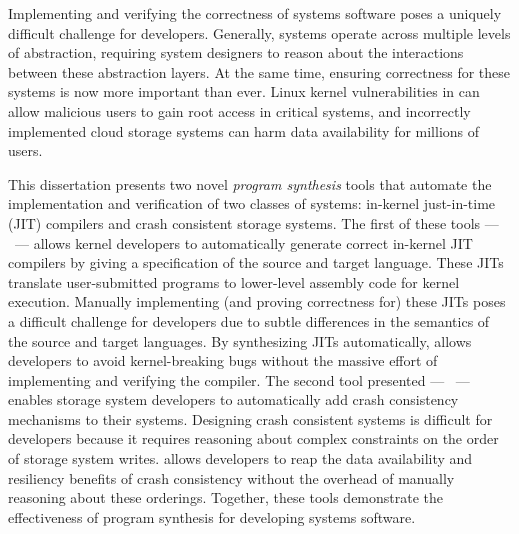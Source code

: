 Implementing and verifying the correctness of systems software
poses a uniquely difficult challenge for developers.
Generally, systems operate across multiple
levels of abstraction, requiring system designers to reason about the
interactions between these abstraction layers.
At the same time, ensuring correctness for these systems is now
more important than ever.
Linux kernel vulnerabilities in can allow malicious users to gain root access
in critical systems, and incorrectly implemented cloud storage systems
can harm data availability for millions of users.

This dissertation presents two novel \textit{program synthesis} tools
that automate the implementation and verification of two classes of systems:
in-kernel just-in-time (JIT) compilers and crash consistent storage systems.
The first of these tools --- \jitsynth\ --- allows kernel developers to automatically
generate correct in-kernel JIT compilers by giving a specification of the source and target language.
These JITs translate user-submitted programs to lower-level assembly code for kernel execution.
Manually implementing (and proving correctness for) these JITs poses a difficult challenge for developers
due to subtle differences in the semantics of the source and target languages.
By synthesizing JITs automatically, \jitsynth allows developers to avoid kernel-breaking bugs
without the massive effort of implementing and verifying the compiler.
The second tool presented --- \depsynth\ --- enables storage system developers to
automatically add crash consistency mechanisms to their systems.
Designing crash consistent systems is difficult for developers because it
requires reasoning about complex constraints on the order of storage system writes.
\depsynth allows developers to reap the data availability and resiliency benefits of crash consistency
without the overhead of manually reasoning about these orderings.
Together, these tools demonstrate the effectiveness of program synthesis for developing systems software.
